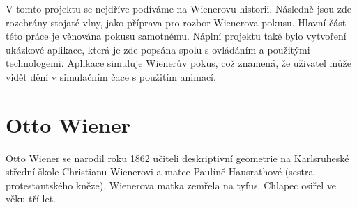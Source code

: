 \documentclass[12pt,a4paper,titlepage,final]{report}
\begin{document}
V tomto projektu se nejdříve podíváme na Wienerovu historii. Následně jsou zde rozebrány stojaté vlny, jako příprava pro rozbor Wienerova 
pokusu. Hlavní část této práce je věnována pokusu samotnému. Náplní projektu také  bylo vytvoření ukázkové aplikace, která je zde popsána
spolu s ovládáním a použitými technologemi. Aplikace simuluje Wienerův pokus, což znamená, že uživatel může vidět dění v simulačním čace s použitím animací.

\newpage 
 
\section{Otto Wiener}

Otto Wiener se narodil roku 1862 učiteli deskriptivní geometrie na Karlsruheské střední škole Christianu Wienerovi 
a matce Paulíně Hausrathové (sestra protestantského kněze). Wienerova matka zemřela na tyfus. Chlapec osiřel ve věku tří let. \cite{encyclopedia_otto}
\end{document}

